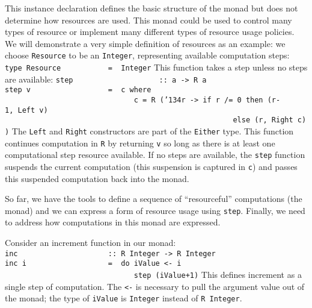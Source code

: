 This instance declaration defines the basic structure of the monad but
does not determine how resources are used.  This monad could be
used to control many types of resource or implement many different
types of resource usage policies.  We will demonstrate a very simple
definition of resources as an example: we choose \mbox{\tt Resource} to be an
\mbox{\tt Integer}, representing available computation steps:
\bprog
\mbox{\tt type\ Resource\ \ \ \ \ \ \ \ \ \ \ =\ \ Integer}
\eprog
This function takes a step unless no steps are available:
\bprog
\mbox{\tt step\ \ \ \ \ \ \ \ \ \ \ \ \ \ \ \ \ \ \ \ ::\ a\ ->\ R\ a}\\
\mbox{\tt step\ v\ \ \ \ \ \ \ \ \ \ \ \ \ \ \ \ \ \ =\ \ c\ where}\\
\mbox{\tt \ \ \ \ \ \ \ \ \ \ \ \ \ \ \ \ \ \ \ \ \ \ \ \ \ \ \ \ \ \ c\ =\ R\ ({\char'134}r\ ->\ if\ r\ /=\ 0\ then\ (r-1,\ Left\ v)}\\
\mbox{\tt \ \ \ \ \ \ \ \ \ \ \ \ \ \ \ \ \ \ \ \ \ \ \ \ \ \ \ \ \ \ \ \ \ \ \ \ \ \ \ \ \ \ \ \ \ \ \ \ \ \ \ \ \ else\ (r,\ Right\ c))}
\eprog
The \mbox{\tt Left} and \mbox{\tt Right} constructors are part of the \mbox{\tt Either} type.
This function continues computation in \mbox{\tt R} by returning \mbox{\tt v} so long as
there is at least one computational step resource available.
If no steps are available, the \mbox{\tt step} function suspends the current
computation (this suspension is captured in \mbox{\tt c}) and passes this
suspended computation back into the monad.  

So far, we have the tools to define a sequence of ``resourceful''
computations (the monad) and we can express a form of resource usage
using \mbox{\tt step}.  Finally, we need to address how computations in this
monad are expressed.  

Consider an increment function in our monad:
\bprog
\mbox{\tt inc\ \ \ \ \ \ \ \ \ \ \ \ \ \ \ \ \ \ \ \ \ ::\ R\ Integer\ ->\ R\ Integer}\\
\mbox{\tt inc\ i\ \ \ \ \ \ \ \ \ \ \ \ \ \ \ \ \ \ \ =\ \ do\ iValue\ <-\ i}\\
\mbox{\tt \ \ \ \ \ \ \ \ \ \ \ \ \ \ \ \ \ \ \ \ \ \ \ \ \ \ \ \ \ \ step\ (iValue+1)}
\eprog
This defines increment as a single step of computation.  The \mbox{\tt <-} is
necessary to pull the argument value out of the monad; the type of
\mbox{\tt iValue} is \mbox{\tt Integer} instead of \mbox{\tt R\ Integer}.  

